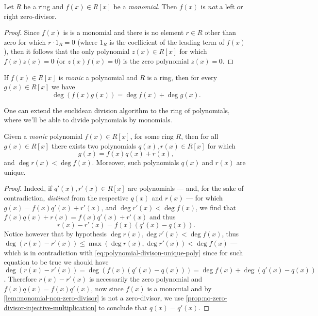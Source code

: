 \begin{lemma}
    \label{lem:monomial-non-zero-divisor}
    Let \(R\) be a ring and \(f(x) \in R[x]\) be a \emph{monomial}. Then \(f(x)\) is
    \emph{not} a left or right zero-divisor.
\end{lemma}

\begin{proof}
    Since \(f(x)\) is is a monomial and there is no element \(r \in R\) other than
    zero for which \(r \cdot 1_R = 0\) (where \(1_R\) is the coefficient of the
    leading term of \(f(x)\)), then it follows that the only polynomial
    \(z(x) \in R[x]\) for which \(f(x) z(x) = 0\) (or \(z(x) f(x) = 0\)) is the zero
    polynomial \(z(x) = 0\).
\end{proof}


\begin{lemma}
    \label{lem:degree-product-of-polynomials}
    If \(f(x) \in R[x]\) is \emph{monic} a polynomial and \(R\) is a ring, then for
    every \(g(x) \in R[x]\) we have
    \[
        \deg (f(x) g(x)) = \deg f(x) + \deg g(x).
    \]
\end{lemma}

One can extend the euclidean division algorithm to the ring of polynomials,
where we'll be able to divide polynomials by monomials.

\begin{lemma}
    \label{lem:division-of-polynomials}
    Given a \emph{monic} polynomial \(f(x) \in R[x]\), for some ring \(R\), then for
    all \(g(x) \in R[x]\) there exists two polynomials \(q(x), r(x) \in R[x]\) for
    which
    \[
        g(x) = f(x) q(x) + r(x),
    \]
    and \(\deg r(x) < \deg f(x)\). Moreover, such polynomials \(q(x)\) and \(r(x)\)
    are unique.
\end{lemma}

\begin{proof}
    Indeed, if \(q'(x), r'(x) \in R[x]\) are polynomials --- and, for the sake of
    contradiction, \emph{distinct} from the respective \(q(x)\) and \(r(x)\) --- for
    which \(g(x) = f(x) q'(x) + r'(x)\), and \(\deg r'(x) < \deg f(x)\), we find
    that \(f(x) q(x) + r(x) = f(x) q'(x) + r'(x)\) and thus
    \begin{equation}\label{eq:polynomial-divison-unique-poly}
        r(x) - r'(x) = f(x) (q'(x) - q(x)).
    \end{equation}
    Notice however that by hypothesis \(\deg r(x), \deg r'(x) < \deg f(x)\), thus
    \(\deg(r(x) - r'(x)) \leq \max(\deg r(x), \deg r'(x)) < \deg f(x)\) --- which is
    in contradiction with \cref{eq:polynomial-divison-unique-poly} since for such
    equation to be true we should have
    \(\deg(r(x) - r'(x)) = \deg(f(x) (q'(x) - q(x))) = \deg f(x) + \deg(q'(x) -
    q(x))\). Therefore \(r(x) - r'(x)\) is necessarily the zero polynomial and
    \(f(x) q(x) = f(x) q'(x)\), now since \(f(x)\) is a monomial and by
    \cref{lem:monomial-non-zero-divisor} is not a zero-divisor, we use
    \cref{prop:no-zero-divisor-injective-multiplication} to conclude that
    \(q(x) = q'(x)\).
\end{proof}

